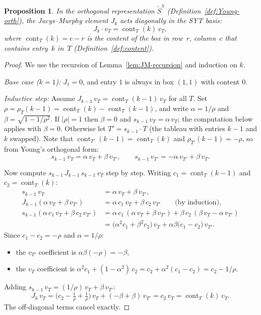 \documentclass[12pt,a4paper]{article}
\newtheorem{proposition}[theorem]{Proposition}
\theoremstyle{definition}
\theoremstyle{remark}
\newcommand{\cont}{\operatorname{cont}}
\begin{document}
\begin{proposition}\label{prop:JM-eigenvalues}
In the orthogonal representation $\widetilde{S}^\lambda$
(Definition~\ref{def:Young-orth}), the Jucys--Murphy element $J_k$
acts diagonally in the SYT basis:
\[
  J_k \cdot v_T = \cont_T(k)\, v_T,
\]
where $\cont_T(k) = c - r$ is the content of the box in row~$r$,
column~$c$ that contains entry~$k$ in~$T$
(Definition~\ref{def:content}).
\end{proposition}

\begin{proof}
We use the recursion of Lemma~\ref{lem:JM-recursion} and induction
on $k$.

\emph{Base case ($k = 1$):} $J_1 = 0$, and entry $1$ is always in
box $(1,1)$ with content $0$.

\emph{Inductive step:} Assume $J_{k-1}\, v_T = \cont_T(k{-}1)\, v_T$
for all $T$. Set $\rho = \rho_T(k{-}1) = \cont_T(k) - \cont_T(k{-}1)$,
and write $\alpha = 1/\rho$ and
$\beta = \sqrt{1 - 1/\rho^2}$. If $|\rho| = 1$ then $\beta = 0$ and
$s_{k-1}\, v_T = \alpha\, v_T$; the computation below applies with
$\beta = 0$. Otherwise let $T' = s_{k-1} \cdot T$ (the tableau with
entries $k{-}1$ and $k$ swapped). Note that $\cont_{T'}(k{-}1) =
\cont_T(k)$ and $\rho_{T'}(k{-}1) = -\rho$, so from
Young's orthogonal form:
\[
  s_{k-1}\, v_T = \alpha\, v_T + \beta\, v_{T'},
  \qquad
  s_{k-1}\, v_{T'} = -\alpha\, v_{T'} + \beta\, v_T.
\]

Now compute $s_{k-1}\, J_{k-1}\, s_{k-1}\, v_T$ step by step.
Writing $c_1 = \cont_T(k{-}1)$ and $c_2 = \cont_T(k)$:
\begin{align*}
  s_{k-1}\, v_T &= \alpha\, v_T + \beta\, v_{T'}, \\
  J_{k-1}(\alpha\, v_T + \beta\, v_{T'})
    &= \alpha\, c_1\, v_T + \beta\, c_2\, v_{T'}
    \qquad\text{(by induction)}, \\
  s_{k-1}(\alpha\, c_1\, v_T + \beta\, c_2\, v_{T'})
    &= \alpha\, c_1\,(\alpha\, v_T + \beta\, v_{T'})
     + \beta\, c_2\,(\beta\, v_T - \alpha\, v_{T'}) \\
    &= \bigl(\alpha^2 c_1 + \beta^2 c_2\bigr)\, v_T
     + \alpha\beta\bigl(c_1 - c_2\bigr)\, v_{T'}.
\end{align*}
Since $c_1 - c_2 = -\rho$ and $\alpha = 1/\rho$:
\begin{itemize}
\item the $v_{T'}$ coefficient is
  $\alpha\beta(-\rho) = -\beta$,
\item the $v_T$ coefficient is
  $\alpha^2 c_1 + (1 - \alpha^2)\, c_2 = c_2 + \alpha^2(c_1 - c_2)
  = c_2 - 1/\rho$.
\end{itemize}
Adding $s_{k-1}\, v_T = (1/\rho)\, v_T + \beta\, v_{T'}$:
\[
  J_k\, v_T
  = \bigl(c_2 - \tfrac{1}{\rho} + \tfrac{1}{\rho}\bigr)\, v_T
  + (-\beta + \beta)\, v_{T'}
  = c_2\, v_T
  = \cont_T(k)\, v_T.
\]
The off-diagonal terms cancel exactly.
\end{proof}
\end{document}
